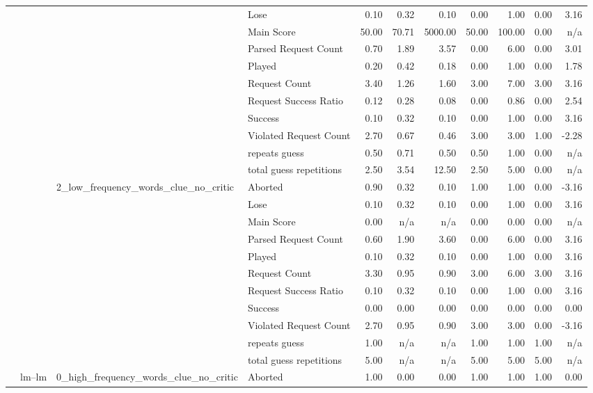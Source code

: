 \begin{tabular}{llllrrrrrrr}
 &  &  & Lose & 0.10 & 0.32 & 0.10 & 0.00 & 1.00 & 0.00 & 3.16 \\
 &  &  & Main Score & 50.00 & 70.71 & 5000.00 & 50.00 & 100.00 & 0.00 & n/a \\
 &  &  & Parsed Request Count & 0.70 & 1.89 & 3.57 & 0.00 & 6.00 & 0.00 & 3.01 \\
 &  &  & Played & 0.20 & 0.42 & 0.18 & 0.00 & 1.00 & 0.00 & 1.78 \\
 &  &  & Request Count & 3.40 & 1.26 & 1.60 & 3.00 & 7.00 & 3.00 & 3.16 \\
 &  &  & Request Success Ratio & 0.12 & 0.28 & 0.08 & 0.00 & 0.86 & 0.00 & 2.54 \\
 &  &  & Success & 0.10 & 0.32 & 0.10 & 0.00 & 1.00 & 0.00 & 3.16 \\
 &  &  & Violated Request Count & 2.70 & 0.67 & 0.46 & 3.00 & 3.00 & 1.00 & -2.28 \\
 &  &  & repeats guess & 0.50 & 0.71 & 0.50 & 0.50 & 1.00 & 0.00 & n/a \\
 &  &  & total guess repetitions & 2.50 & 3.54 & 12.50 & 2.50 & 5.00 & 0.00 & n/a \\
\cline{3-11}
 &  & \multirow[t]{11}{*}{2_low_frequency_words_clue_no_critic} & Aborted & 0.90 & 0.32 & 0.10 & 1.00 & 1.00 & 0.00 & -3.16 \\
 &  &  & Lose & 0.10 & 0.32 & 0.10 & 0.00 & 1.00 & 0.00 & 3.16 \\
 &  &  & Main Score & 0.00 & n/a & n/a & 0.00 & 0.00 & 0.00 & n/a \\
 &  &  & Parsed Request Count & 0.60 & 1.90 & 3.60 & 0.00 & 6.00 & 0.00 & 3.16 \\
 &  &  & Played & 0.10 & 0.32 & 0.10 & 0.00 & 1.00 & 0.00 & 3.16 \\
 &  &  & Request Count & 3.30 & 0.95 & 0.90 & 3.00 & 6.00 & 3.00 & 3.16 \\
 &  &  & Request Success Ratio & 0.10 & 0.32 & 0.10 & 0.00 & 1.00 & 0.00 & 3.16 \\
 &  &  & Success & 0.00 & 0.00 & 0.00 & 0.00 & 0.00 & 0.00 & 0.00 \\
 &  &  & Violated Request Count & 2.70 & 0.95 & 0.90 & 3.00 & 3.00 & 0.00 & -3.16 \\
 &  &  & repeats guess & 1.00 & n/a & n/a & 1.00 & 1.00 & 1.00 & n/a \\
 &  &  & total guess repetitions & 5.00 & n/a & n/a & 5.00 & 5.00 & 5.00 & n/a \\
\cline{2-11} \cline{3-11}
 & \multirow[t]{33}{*}{lm--lm} & \multirow[t]{11}{*}{0_high_frequency_words_clue_no_critic} & Aborted & 1.00 & 0.00 & 0.00 & 1.00 & 1.00 & 1.00 & 0.00 \\

\end{tabular}
